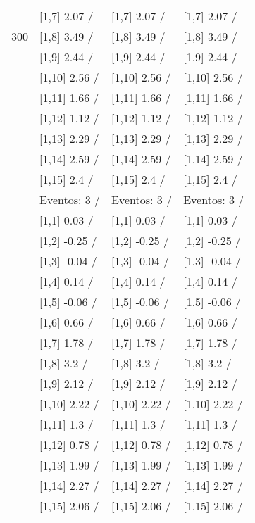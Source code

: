 \begin{table}
\begin{tabular}[t]{llll}
 & {}[1,7] 2.07  / & {}[1,7] 2.07  / & {}[1,7] 2.07  /\\
300 & {}[1,8] 3.49  / & {}[1,8] 3.49  / & {}[1,8] 3.49  /\\
\addlinespace
 & {}[1,9] 2.44  / & {}[1,9] 2.44  / & {}[1,9] 2.44  /\\
 & {}[1,10] 2.56  / & {}[1,10] 2.56  / & {}[1,10] 2.56  /\\
 & {}[1,11] 1.66  / & {}[1,11] 1.66  / & {}[1,11] 1.66  /\\
 & {}[1,12] 1.12  / & {}[1,12] 1.12  / & {}[1,12] 1.12  /\\
 & {}[1,13] 2.29  / & {}[1,13] 2.29  / & {}[1,13] 2.29  /\\
\addlinespace
 & {}[1,14] 2.59  / & {}[1,14] 2.59  / & {}[1,14] 2.59  /\\
 & {}[1,15] 2.4  / & {}[1,15] 2.4  / & {}[1,15] 2.4  /\\
 & Eventos:  3 / & Eventos:  3 / & Eventos:  3 /\\
 & {}[1,1] 0.03  / & {}[1,1] 0.03  / & {}[1,1] 0.03  /\\
 & {}[1,2] -0.25  / & {}[1,2] -0.25  / & {}[1,2] -0.25  /\\
\addlinespace
 & {}[1,3] -0.04  / & {}[1,3] -0.04  / & {}[1,3] -0.04  /\\
 & {}[1,4] 0.14  / & {}[1,4] 0.14  / & {}[1,4] 0.14  /\\
 & {}[1,5] -0.06  / & {}[1,5] -0.06  / & {}[1,5] -0.06  /\\
 & {}[1,6] 0.66  / & {}[1,6] 0.66  / & {}[1,6] 0.66  /\\
 & {}[1,7] 1.78  / & {}[1,7] 1.78  / & {}[1,7] 1.78  /\\
\addlinespace
500 & {}[1,8] 3.2  / & {}[1,8] 3.2  / & {}[1,8] 3.2  /\\
 & {}[1,9] 2.12  / & {}[1,9] 2.12  / & {}[1,9] 2.12  /\\
 & {}[1,10] 2.22  / & {}[1,10] 2.22  / & {}[1,10] 2.22  /\\
 & {}[1,11] 1.3  / & {}[1,11] 1.3  / & {}[1,11] 1.3  /\\
 & {}[1,12] 0.78  / & {}[1,12] 0.78  / & {}[1,12] 0.78  /\\
\addlinespace
 & {}[1,13] 1.99  / & {}[1,13] 1.99  / & {}[1,13] 1.99  /\\
 & {}[1,14] 2.27  / & {}[1,14] 2.27  / & {}[1,14] 2.27  /\\
 & {}[1,15] 2.06  / & {}[1,15] 2.06  / & {}[1,15] 2.06  /\\
\bottomrule
\end{tabular}
\end{table}
